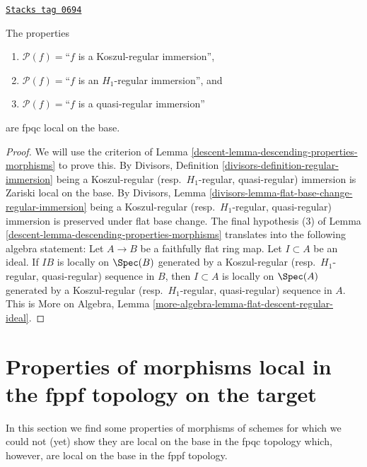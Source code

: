 \begin{lemma}
\label{descent-lemma-descending-property-regular-immersion}
\href{https://stacks.math.columbia.edu/tag/0694}{\texttt{Stacks tag 0694}}

The properties
\begin{enumerate}
\item[] $\mathcal{P}(f) =$``$f$ is a Koszul-regular immersion'',
\item[] $\mathcal{P}(f) =$``$f$ is an $H_1$-regular immersion'', and
\item[] $\mathcal{P}(f) =$``$f$ is a quasi-regular immersion''
\end{enumerate}
are fpqc local on the base.
\end{lemma}

\begin{proof}

We will use the criterion of
Lemma \ref{descent-lemma-descending-properties-morphisms}
to prove this. By
Divisors, Definition \ref{divisors-definition-regular-immersion}
being a Koszul-regular (resp.\ $H_1$-regular, quasi-regular)
immersion is Zariski local on the base. By
Divisors, Lemma \ref{divisors-lemma-flat-base-change-regular-immersion}
being a Koszul-regular (resp.\ $H_1$-regular, quasi-regular)
immersion is preserved under flat base change.
The final hypothesis (3) of
Lemma \ref{descent-lemma-descending-properties-morphisms}
translates into the following algebra statement:
Let $A \to B$ be a faithfully flat ring map. Let $I \subset A$ be an ideal.
If $IB$ is locally on $\Spec(B)$ generated by a Koszul-regular
(resp.\ $H_1$-regular, quasi-regular) sequence in $B$, then $I \subset A$
is locally on $\Spec(A)$ generated by a Koszul-regular
(resp.\ $H_1$-regular, quasi-regular) sequence in $A$. This is
More on Algebra, Lemma \ref{more-algebra-lemma-flat-descent-regular-ideal}.
\end{proof}

\section{Properties of morphisms local in the fppf topology on the target}
\label{descent-section-descending-properties-morphisms-fppf}
In this section we find some properties of morphisms of schemes
for which we could not (yet) show they are local on the base in
the fpqc topology which, however, are local on the base
in the fppf topology.


